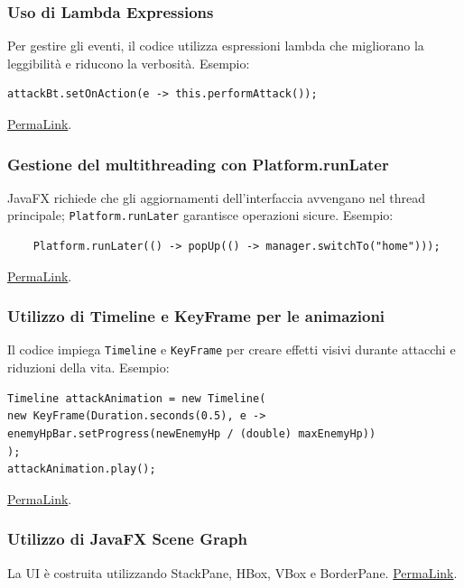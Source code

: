 \documentclass[a4paper,12pt]{report}
\begin{document}
\subsubsection{Uso di Lambda Expressions}
Per gestire gli eventi, il codice utilizza espressioni lambda che migliorano la leggibilità e riducono la verbosità.\newline
Esempio:
\begin{verbatim}
attackBt.setOnAction(e -> this.performAttack());
\end{verbatim}
\href{https://github.com/Matt2309/temple-tower/blob/297b37062035f41c3e9258656beace208905a368/src/main/java/it/unibo/templetower/view/CombatView.java#L178}{PermaLink}.

\subsubsection{Gestione del multithreading con Platform.runLater}
JavaFX richiede che gli aggiornamenti dell'interfaccia avvengano nel thread principale; \texttt{Platform.runLater} garantisce operazioni sicure.\newline
Esempio:
\begin{verbatim}
    Platform.runLater(() -> popUp(() -> manager.switchTo("home")));
\end{verbatim}
\href{https://github.com/Matt2309/temple-tower/blob/297b37062035f41c3e9258656beace208905a368/src/main/java/it/unibo/templetower/view/CombatView.java#L259}{PermaLink}.

\subsubsection{Utilizzo di Timeline e KeyFrame per le animazioni}
Il codice impiega \texttt{Timeline} e \texttt{KeyFrame} per creare effetti visivi durante attacchi e riduzioni della vita.\newline
Esempio:
\begin{verbatim}
Timeline attackAnimation = new Timeline(
new KeyFrame(Duration.seconds(0.5), e -> enemyHpBar.setProgress(newEnemyHp / (double) maxEnemyHp))
);
attackAnimation.play();
\end{verbatim}
\href{https://github.com/Matt2309/temple-tower/blob/297b37062035f41c3e9258656beace208905a368/src/main/java/it/unibo/templetower/view/CombatView.java#L205}{PermaLink}.

\subsubsection{Utilizzo di JavaFX Scene Graph}
La UI è costruita utilizzando StackPane, HBox, VBox e BorderPane.\newline
\href{https://github.com/Matt2309/temple-tower/blob/297b37062035f41c3e9258656beace208905a368/src/main/java/it/unibo/templetower/view/CombatView.java#L65}{PermaLink}.
\end{document}
